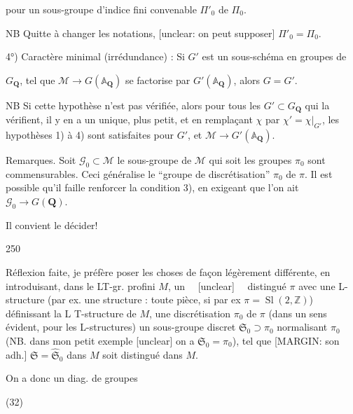 pour un sous-groupe d'indice fini
convenable $\Pi'_0$ de $\Pi_0$.

NB Quitte à changer les notations, [unclear: on peut supposer] $\Pi'_0 = \Pi_0$.

4°) Caractère minimal (irrédundance) :
Si $G'$ est un sous-schéma en groupes de

\newpage


$G_{\mathbf{Q}}$, tel que $\mathcal{M} \to G(\mathbb{A}_{\mathbf{Q}})$ se factorise par $G'(\mathbb{A}_{\mathbf{Q}})$, alors $G=G'$.

NB Si cette hypothèse n'est pas vérifiée, alors pour tous les $G' \subset G_{\mathbf{Q}}$ qui la vérifient, il y en a un unique, plus petit, et en remplaçant $\chi$ par $\chi' = \chi|_{G'}$, les hypothèses 1) à 4) sont satisfaites pour $G'$, et $\mathcal{M} \to G'(\mathbb{A}_{\mathbf{Q}})$.

\medskip

\noindent Remarques. Soit $\mathcal{G}_0 \subset \mathcal{M}$ le sous-groupe de $\mathcal{M}$ qui  soit les groupes $\pi_0$ sont commensurables. Ceci généralise le ``groupe de discrétisation'' $\pi_0$ de $\pi$.
Il est possible qu'il faille renforcer la condition 3), en exigeant que l'on ait $\mathcal{G}_0 \to G(\mathbf{Q})$.

Il convient le décider!

\newpage


250

Réflexion faite, je préfère poser les choses de
façon légèrement différente, en introduisant,
dans le LT-gr. profini $M$, un ~~[unclear]~~
distingué $\pi$ avec une L-structure (par
ex. une structure : toute pièce,
si par ex $\pi = \operatorname{Sl}(2, \mathbb{Z})$) définissant la
L T-structure de $M$, une discrétisation
$\pi_0$ de $\pi$ (dans un sens évident, pour les
L-structures) un sous-groupe discret
$\mathfrak{S}_0 \supset \pi_0$ normalisant $\pi_0$ (NB. dans mon petit
exemple [unclear] on a $\mathfrak{S}_0 = \pi_0$), tel que
[MARGIN: son adh.] $\mathfrak{S} = \widehat{\mathfrak{S}}_0$ dans $M$ soit distingué dans $M$.

On a donc un diag. de groupes

(32)

